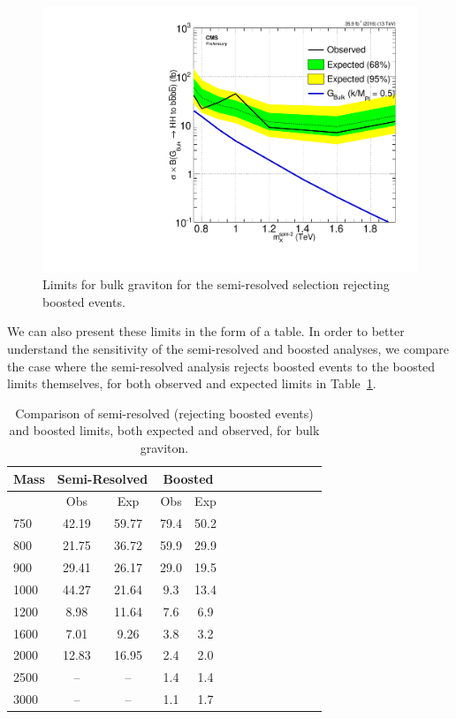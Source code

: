 \begin{figure}[thb!]
\begin{center}
\includegraphics[scale=0.5]{F5/brazilianFlag_2p1BGboost_HH4b2p1_HH4b2p1_13TeV.pdf}
\end{center}
\caption{Limits for bulk graviton for the semi-resolved selection rejecting boosted events.}
\label{fig:BGblindboost}
\end{figure} 

We can also present these limits in the form of a table. In order to better understand the sensitivity of the semi-resolved and boosted analyses, we compare the case where the semi-resolved analysis rejects boosted events to the boosted limits themselves, for both observed and expected limits in Table~\ref{tab:boostcompareBG}.

\begin{table}[h]
\begin{center}
\begin{tabular}{|l|c|c|c|c|c|c|c|c|c|c|c|c|}
\hline
Mass & \multicolumn{2}{|c|}{Semi-Resolved} & \multicolumn{2}{|c|}{Boosted}\\ \hline
& Obs & Exp & Obs & Exp\\ \hline
750 & 42.19 & 59.77 & 79.4 & 50.2\\
800 & 21.75 & 36.72 & 59.9 & 29.9\\
900 & 29.41 & 26.17 & 29.0 & 19.5\\ 
1000 & 44.27 & 21.64 &9.3 & 13.4\\
1200 & 8.98 & 11.64 & 7.6 & 6.9\\
1600 & 7.01 & 9.26 & 3.8 & 3.2\\
2000 &  12.83 & 16.95 & 2.4 & 2.0\\
2500 & -- & -- & 1.4 & 1.4\\
3000 & -- & -- & 1.1 & 1.7 \\
\hline
\end{tabular}
\end{center}
\caption{Comparison of semi-resolved (rejecting boosted events) and boosted limits, both expected and observed, for bulk graviton.}
\label{tab:boostcompareBG}
\end{table}

